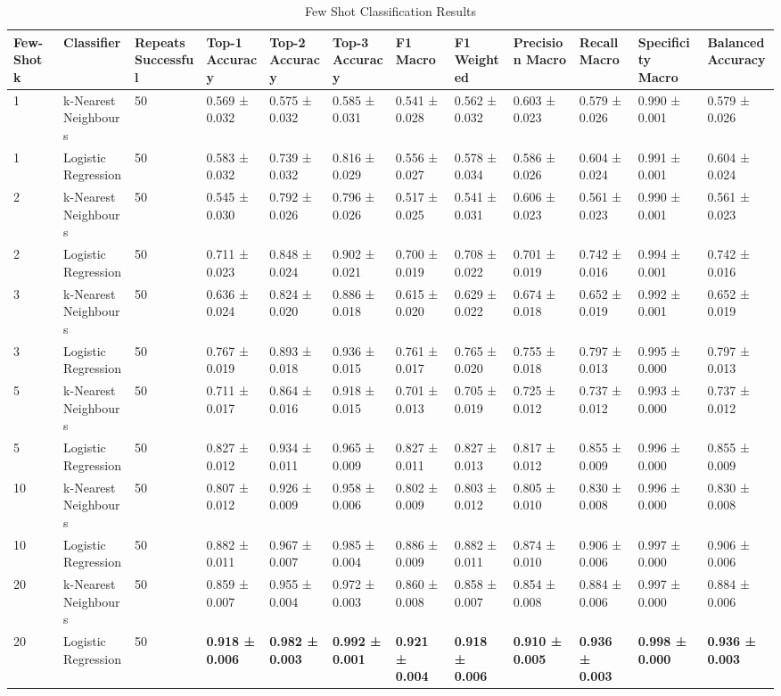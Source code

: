 
\begin{table}[ht]
\centering
\tiny  %
\caption{Few Shot Classification Results}
\label{tab:few_shotclassification_results}
\begin{tabularx}{\textwidth}{lXXXXXXXXXXX}
\toprule
Few-Shot k & Classifier & Repeats Successful & Top-1 Accuracy & Top-2 Accuracy & Top-3 Accuracy & F1 Macro & F1 Weighted & Precision Macro & Recall Macro & Specificity Macro & Balanced Accuracy \\
\midrule
1 & k-Nearest Neighbours & 50 & 0.569 ± 0.032 & 0.575 ± 0.032 & 0.585 ± 0.031 & 0.541 ± 0.028 & 0.562 ± 0.032 & 0.603 ± 0.023 & 0.579 ± 0.026 & 0.990 ± 0.001 & 0.579 ± 0.026 \\
1 & Logistic Regression & 50 & 0.583 ± 0.032 & 0.739 ± 0.032 & 0.816 ± 0.029 & 0.556 ± 0.027 & 0.578 ± 0.034 & 0.586 ± 0.026 & 0.604 ± 0.024 & 0.991 ± 0.001 & 0.604 ± 0.024 \\
2 & k-Nearest Neighbours & 50 & 0.545 ± 0.030 & 0.792 ± 0.026 & 0.796 ± 0.026 & 0.517 ± 0.025 & 0.541 ± 0.031 & 0.606 ± 0.023 & 0.561 ± 0.023 & 0.990 ± 0.001 & 0.561 ± 0.023 \\
2 & Logistic Regression & 50 & 0.711 ± 0.023 & 0.848 ± 0.024 & 0.902 ± 0.021 & 0.700 ± 0.019 & 0.708 ± 0.022 & 0.701 ± 0.019 & 0.742 ± 0.016 & 0.994 ± 0.001 & 0.742 ± 0.016 \\
3 & k-Nearest Neighbours & 50 & 0.636 ± 0.024 & 0.824 ± 0.020 & 0.886 ± 0.018 & 0.615 ± 0.020 & 0.629 ± 0.022 & 0.674 ± 0.018 & 0.652 ± 0.019 & 0.992 ± 0.001 & 0.652 ± 0.019 \\
3 & Logistic Regression & 50 & 0.767 ± 0.019 & 0.893 ± 0.018 & 0.936 ± 0.015 & 0.761 ± 0.017 & 0.765 ± 0.020 & 0.755 ± 0.018 & 0.797 ± 0.013 & 0.995 ± 0.000 & 0.797 ± 0.013 \\
5 & k-Nearest Neighbours & 50 & 0.711 ± 0.017 & 0.864 ± 0.016 & 0.918 ± 0.015 & 0.701 ± 0.013 & 0.705 ± 0.019 & 0.725 ± 0.012 & 0.737 ± 0.012 & 0.993 ± 0.000 & 0.737 ± 0.012 \\
5 & Logistic Regression & 50 & 0.827 ± 0.012 & 0.934 ± 0.011 & 0.965 ± 0.009 & 0.827 ± 0.011 & 0.827 ± 0.013 & 0.817 ± 0.012 & 0.855 ± 0.009 & 0.996 ± 0.000 & 0.855 ± 0.009 \\
10 & k-Nearest Neighbours & 50 & 0.807 ± 0.012 & 0.926 ± 0.009 & 0.958 ± 0.006 & 0.802 ± 0.009 & 0.803 ± 0.012 & 0.805 ± 0.010 & 0.830 ± 0.008 & 0.996 ± 0.000 & 0.830 ± 0.008 \\
10 & Logistic Regression & 50 & 0.882 ± 0.011 & 0.967 ± 0.007 & 0.985 ± 0.004 & 0.886 ± 0.009 & 0.882 ± 0.011 & 0.874 ± 0.010 & 0.906 ± 0.006 & 0.997 ± 0.000 & 0.906 ± 0.006 \\
20 & k-Nearest Neighbours & 50 & 0.859 ± 0.007 & 0.955 ± 0.004 & 0.972 ± 0.003 & 0.860 ± 0.008 & 0.858 ± 0.007 & 0.854 ± 0.008 & 0.884 ± 0.006 & 0.997 ± 0.000 & 0.884 ± 0.006 \\
20 & Logistic Regression & 50 & \textbf{0.918 ± 0.006} & \textbf{0.982 ± 0.003} & \textbf{0.992 ± 0.001} & \textbf{0.921 ± 0.004} & \textbf{0.918 ± 0.006} & \textbf{0.910 ± 0.005} & \textbf{0.936 ± 0.003} & \textbf{0.998 ± 0.000} & \textbf{0.936 ± 0.003} \\
\bottomrule
\bottomrule
\end{tabularx}
\end{table}
